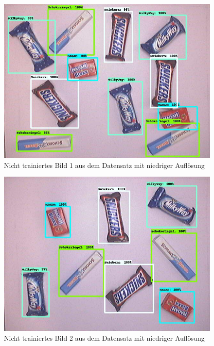     \begin{figure}[H]
        \centering
        \includegraphics[angle = 90, width = \textwidth]{Bilder/models/model_comparison/ssd_resnet50_v1_fpn_640x640_coco17_tpu-8/non_trained_1.jpg}
        \caption{Nicht trainiertes Bild 1 aus dem Datensatz mit niedriger Auflösung}
    \end{figure}
    
    \begin{figure}[H]
        \centering
        \includegraphics[angle = 90, width = \textwidth]{Bilder/models/model_comparison/ssd_resnet50_v1_fpn_640x640_coco17_tpu-8/non_trained_2.jpg}
        \caption{Nicht trainiertes Bild 2 aus dem Datensatz mit niedriger Auflösung}
    \end{figure}
    
